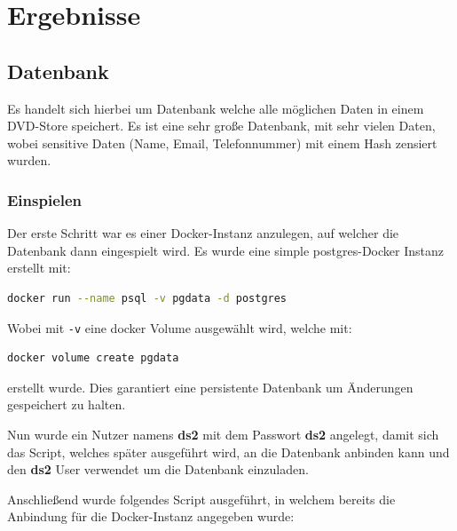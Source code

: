 
\section{Ergebnisse}
\label{sec:Ergebnisse}

\subsection{Datenbank}
Es handelt sich hierbei um  Datenbank welche alle möglichen Daten in einem DVD-Store speichert. Es ist eine sehr große Datenbank, mit sehr vielen Daten, wobei sensitive Daten (Name, Email, Telefonnummer) mit einem Hash zensiert wurden.
\subsubsection{Einspielen}
Der erste Schritt war es einer Docker-Instanz anzulegen, auf welcher die Datenbank dann eingespielt wird. Es wurde eine simple postgres-Docker Instanz erstellt mit:

\begin{lstlisting}[language=bash]
docker run --name psql -v pgdata -d postgres
\end{lstlisting}

Wobei mit \verb|-v| eine docker Volume ausgewählt wird, welche mit: 

\begin{lstlisting}[language=bash]
docker volume create pgdata
\end{lstlisting}

erstellt wurde. Dies garantiert eine persistente Datenbank um Änderungen gespeichert zu halten. 

Nun wurde ein Nutzer namens \textbf{ds2} mit dem Passwort \textbf{ds2} angelegt, damit sich das Script, welches später ausgeführt wird, an die Datenbank anbinden kann und den \textbf{ds2}  User verwendet um die Datenbank einzuladen.

Anschließend wurde folgendes Script ausgeführt, in welchem bereits die Anbindung für die Docker-Instanz angegeben wurde:

